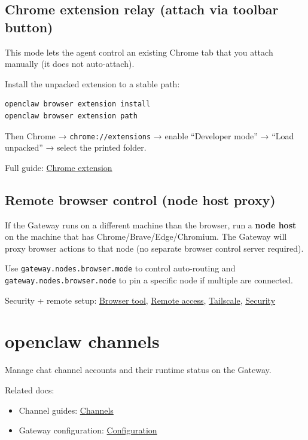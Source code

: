 \subsection{Chrome extension relay (attach via toolbar button)}


This mode lets the agent control an existing Chrome tab that you attach manually (it does not auto-attach).

Install the unpacked extension to a stable path:

\begin{lstlisting}[language=bash]
openclaw browser extension install
openclaw browser extension path
\end{lstlisting}


Then Chrome → \texttt{chrome://extensions} → enable “Developer mode” → “Load unpacked” → select the printed folder.

Full guide: \href{/tools/chrome-extension}{Chrome extension}

\subsection{Remote browser control (node host proxy)}


If the Gateway runs on a different machine than the browser, run a \textbf{node host} on the machine that has Chrome/Brave/Edge/Chromium. The Gateway will proxy browser actions to that node (no separate browser control server required).

Use \texttt{gateway.nodes.browser.mode} to control auto-routing and \texttt{gateway.nodes.browser.node} to pin a specific node if multiple are connected.

Security + remote setup: \href{/tools/browser}{Browser tool}, \href{/gateway/remote}{Remote access}, \href{/gateway/tailscale}{Tailscale}, \href{/gateway/security}{Security}


\clearpage

\section{openclaw channels}


Manage chat channel accounts and their runtime status on the Gateway.

Related docs:

\begin{itemize}
  \item Channel guides: \href{/channels/index}{Channels}
  \item Gateway configuration: \href{/gateway/configuration}{Configuration}
\end{itemize}


